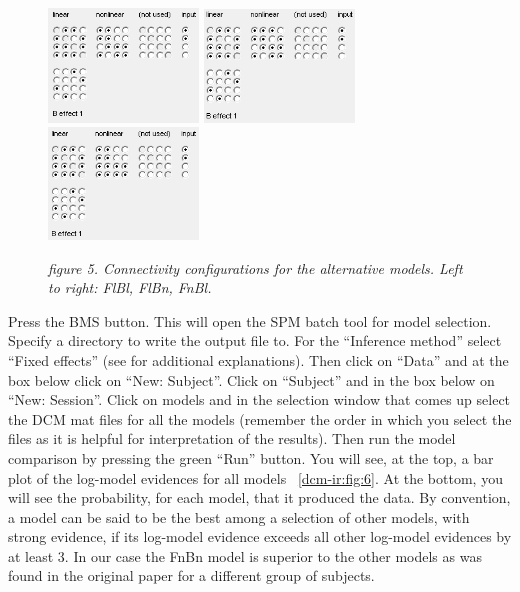 \begin{figure}
\begin{center}
\includegraphics[width=40mm]{dcm_ir/figures/figure5_FlBl}
\includegraphics[width=40mm]{dcm_ir/figures/figure5_FlBn}
\includegraphics[width=40mm]{dcm_ir/figures/figure5_FnBl}
\caption{\em  figure 5. Connectivity configurations for the alternative models. Left to right: FlBl, FlBn, FnBl. \label{dcm-ir:fig:5}}
\end{center}
\end{figure}

Press the \textsc{BMS} button. This will open the SPM batch tool for model selection. Specify a directory to write the output file to.  For the ``Inference method'' select ``Fixed effects'' (see \cite{klaas_bms} for additional explanations). Then click on ``Data'' and at the box below click on ``New: Subject''. Click on ``Subject'' and in the box below on ``New: Session''. Click on models and in the selection window that comes up select the DCM mat files for all the models (remember the order in which you select the files as it is helpful for interpretation of the results). Then run the model comparison by pressing the green ``Run'' button. You will see, at the top, a bar plot of the log-model evidences for all models ~\ref{dcm-ir:fig:6}. At the bottom, you will see the probability, for each model, that it produced the data. By convention, a model can be said to be the best among a selection of other models, with strong evidence, if its log-model evidence exceeds all other log-model evidences by at least 3. In our case the FnBn model is superior to the other models as was found in the original paper \cite{cc_asymm} for a different group of subjects. 

